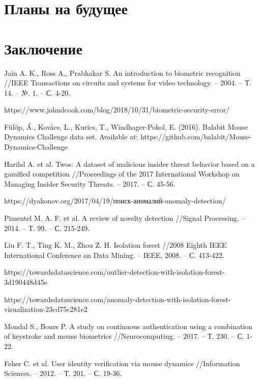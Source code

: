\documentclass[12pt]{article}
\begin{document}
    \section{Планы на будущее}
    \label{sec:Future}

    \newpage



    \section{Заключение}
    \label{sec:Conclusion}

    \newpage



    \begin{thebibliography}{20}
        Jain A. K., Ross A., Prabhakar S. An introduction to biometric recognition //IEEE Transactions on circuits and systems for video technology. – 2004. – Т. 14. – №. 1. – С. 4-20.

        https://www.johndcook.com/blog/2018/10/31/biometric-security-error/

        Fülöp, Á., Kovács, L., Kurics, T., Windhager-Pokol, E. (2016). Balabit Mouse Dynamics Challenge data set. Available at: https://github.com/balabit/Mouse-Dynamics-Challenge

        Harilal A. et al. Twos: A dataset of malicious insider threat behavior based on a gamified competition //Proceedings of the 2017 International Workshop on Managing Insider Security Threats. – 2017. – С. 45-56.
        
        https://dyakonov.org/2017/04/19/поиск-аномалий-anomaly-detection/
        
        Pimentel M. A. F. et al. A review of novelty detection //Signal Processing. – 2014. – Т. 99. – С. 215-249.
        
        Liu F. T., Ting K. M., Zhou Z. H. Isolation forest //2008 Eighth IEEE International Conference on Data Mining. – IEEE, 2008. – С. 413-422.
        
        https://towardsdatascience.com/outlier-detection-with-isolation-forest-3d190448d45e
        
        https://towardsdatascience.com/anomaly-detection-with-isolation-forest-visualization-23cd75c281e2

        Mondal S., Bours P. A study on continuous authentication using a combination of keystroke and mouse biometrics //Neurocomputing. – 2017. – Т. 230. – С. 1-22.

        Feher C. et al. User identity verification via mouse dynamics //Information Sciences. – 2012. – Т. 201. – С. 19-36.
        
    \end{thebibliography}
\end{document}
